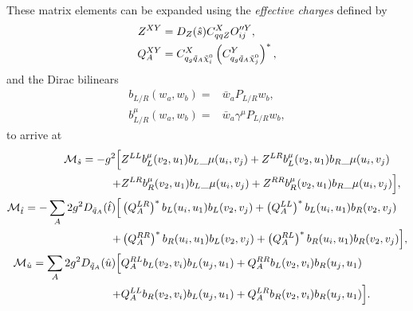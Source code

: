 \documentclass[../main.tex]{subfiles}
\begin{document}
These matrix elements can be expanded using the \textit{effective charges} defined by
\begin{subequations}
  \label{part:eq:eff_charges}
  \begin{align}
    Z^{XY}   & = D_Z(\hat{s}) C_{qqZ}^X O_{ij}^{\prime\prime Y},                                   \\
    Q_A^{XY} & = C_{q_g \tilde{q}_A \nino[i]}^{X} \pclosed{C_{q_g \tilde{q}_A \nino[j]}^{Y}}^\ast,
  \end{align}
\end{subequations}
and the Dirac bilinears
\begin{subequations}
  \begin{align}
    b_{L/R}(w_a, w_b) =     & \bar{w}_a P_{L/R} w_b,            \\
    b_{L/R}^\mu(w_a, w_b) = & \bar{w}_a \gamma^\mu P_{L/R} w_b,
  \end{align}
\end{subequations}
to arrive at
\begin{subequations}
  \label{part:eq:MLO}
  \begin{align}
    \nonumber
    \M_{\hat{s}} = -g^2 \Big[                                  &
    Z^{LL} b_L^\mu(v_2, u_1){b_L}\_{\mu}(u_i, v_j) + Z^{LR} b_L^\mu(v_2, u_1){b_R}\_{\mu}(u_i, v_j)                 \\
    +                                                          & Z^{LR} b_{R}^\mu(v_2, u_1){b_L}\_{\mu}(u_i, v_j) +
    Z^{RR} b_R^\mu(v_2, u_1){b_R}\_{\mu}(u_i, v_j) \Big],                                                           \\
    \nonumber
    \M_{\hat{t}} = -\sum_A 2g^2 D_{\tilde{q}_A}(\hat{t}) \Big[ &
    \pclosed{Q_A^{LR}}^\ast b_L(u_i, u_1) b_L(v_2, v_j) +
    \pclosed{Q_A^{LL}}^\ast
    b_L(u_i, u_1) b_R(v_2, v_j)                                                                                     \\
    +                                                          &
    \pclosed{Q_A^{RR}}^\ast b_R(u_i, u_1) b_L(v_2, v_j) +
    \pclosed{Q_A^{RL}}^\ast
    b_R(u_i, u_1) b_R(v_2, v_j) \Big],                                                                              \\
    \nonumber
    \M_{\hat{u}} = \sum_A 2g^2 D_{\tilde{q}_A}(\hat{u}) \Big[  &
    Q_A^{RL} b_L(v_2, v_i) b_L(u_j, u_1) + Q_A^{RR} b_L(v_2, v_i)
    b_R(u_j, u_1)
    \\
    +                                                          &
    Q_A^{LL} b_R(v_2, v_i) b_L(u_j, u_1) + Q_A^{LR} b_R(v_2, v_i)
    b_R(u_j, u_1)
    \Big].
  \end{align}
\end{subequations}
\end{document}
